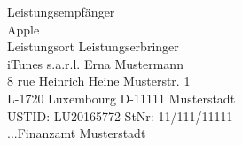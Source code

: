 \documentclass{article}
\begin{document}
\noindent
\pagestyle{empty}
Leistungsempf\"anger\\
Apple\\
Leistungsort \hfill Leistungserbringer\\
iTunes s.a.r.l. \hfill Erna Mustermann\\
8 rue Heinrich Heine \hfill Musterstr. 1\\
L-1720 Luxembourg \hfill D-11111 Musterstadt\\
USTID: LU20165772 \hfill StNr: 11/111/11111\\
...\hfill Finanzamt Musterstadt\\
\vspace{1cm}

\noindent
\end{document}

